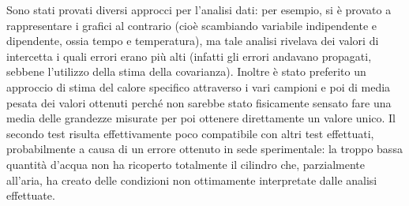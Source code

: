  Sono stati provati diversi approcci per l'analisi dati: per esempio, si è provato a rappresentare i grafici al
 contrario (cioè scambiando variabile indipendente e dipendente, ossia tempo e temperatura), ma tale analisi rivelava
 dei valori di intercetta i quali errori erano più alti (infatti gli errori andavano propagati, sebbene l'utilizzo
 della stima della covarianza). Inoltre è stato preferito un approccio di stima del calore specifico attraverso
 i vari campioni e poi di media pesata dei valori ottenuti perché non sarebbe stato fisicamente sensato fare una
 media delle grandezze misurate per poi ottenere direttamente un valore unico.
 Il secondo test risulta effettivamente poco compatibile con altri test effettuati, probabilmente a causa di un errore
 ottenuto in sede sperimentale: la troppo bassa quantità d'acqua non ha ricoperto totalmente il cilindro che,
 parzialmente all'aria, ha creato delle condizioni non ottimamente interpretate dalle analisi effettuate.
 
